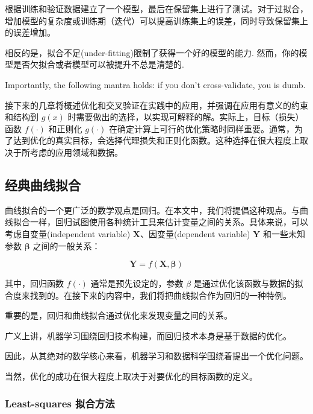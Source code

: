 \documentclass{ctexart}
\begin{document}
根据训练和验证数据建立了一个模型，最后在保留集上进行了测试。对于过拟合，增加模型的复杂度或训练期（迭代）可以提高训练集上的误差，同时导致保留集上的误差增加。

相反的是，拟合不足(under-fitting)限制了获得一个好的模型的能力.
然而，你的模型是否欠拟合或者模型可以被提升不总是清楚的.

 Importantly, the following mantra holds: if you don’t cross-validate,
you is dumb.

接下来的几章将概述优化和交叉验证在实践中的应用，并强调在应用有意义的约束和结构到 \( g(x) \) 时需要做出的选择，以实现可解释的解。实际上，目标（损失）函数 \( f(\cdot) \) 和正则化 \( g(\cdot) \) 在确定计算上可行的优化策略时同样重要。通常，为了达到优化的真实目标，会选择代理损失和正则化函数。这种选择在很大程度上取决于所考虑的应用领域和数据。


\subsection{经典曲线拟合}

曲线拟合的一个更广泛的数学观点是回归。在本文中，我们将提倡这种观点。与曲线拟合一样，回归试图使用各种统计工具来估计变量之间的关系。具体来说，可以考虑自变量(independent variable) \( \mathbf{X} \)、因变量(dependent variable) \( \mathbf{Y} \) 和一些未知参数 \( \mathbf{\beta} \) 之间的一般关系：

\begin{equation}
    \mathbf{Y} = f(\mathbf{X}, \mathbf{\beta})
\end{equation}

其中，回归函数 \( f(\cdot) \) 通常是预先设定的，参数 \( \beta \) 是通过优化该函数与数据的拟合度来找到的。在接下来的内容中，我们将把曲线拟合作为回归的一种特例。

\vspace{6ex} %

{\color{Red}重要的是，回归和曲线拟合通过优化来发现变量之间的关系。

广义上讲，机器学习围绕回归技术构建，而回归技术本身是基于数据的优化。

因此，从其绝对的数学核心来看，机器学习和数据科学围绕着提出一个优化问题。

当然，优化的成功在很大程度上取决于对要优化的目标函数的定义。}


\subsubsection*{Least-squares 拟合方法}
\end{document}
